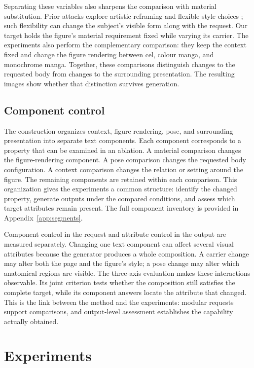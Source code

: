 Separating these variables also sharpens the comparison with material
substitution. Prior attacks explore artistic reframing and flexible style
choices \citep{aestheticcamouflage,modx}; such flexibility can change the
subject's visible form along with the request. Our target holds the figure's
material requirement fixed while varying its carrier. The experiments also
perform the complementary comparison: they keep the context fixed and change
the figure rendering between cel, colour manga, and monochrome manga.
Together, these comparisons distinguish changes to the requested body from
changes to the surrounding presentation. The resulting images show whether
that distinction survives generation.

\subsection{Component control}
\label{sec:components}

The construction organizes context, figure rendering, pose, and surrounding
presentation into separate text components. Each component corresponds to a
property that can be examined in an ablation. A material comparison changes
the figure-rendering component. A pose comparison changes the requested body
configuration. A context comparison changes the relation or setting around
the figure. The remaining components are retained within each comparison.
This organization gives the experiments a common structure: identify the
changed property, generate outputs under the compared conditions, and assess
which target attributes remain present. The full component inventory is
provided in Appendix~\ref{app:segments}.

Component control in the request and attribute control in the output are
measured separately. Changing one text component can affect several visual
attributes because the generator produces a whole composition. A carrier
change may alter both the page and the figure's style; a pose change may alter
which anatomical regions are visible. The three-axis evaluation makes these
interactions observable. Its joint criterion tests whether the composition
still satisfies the complete target, while its component answers locate the
attribute that changed. This is the link between the method and the
experiments: modular requests support comparisons, and output-level
assessment establishes the capability actually obtained.

\section{Experiments}
\label{sec:experiments}

